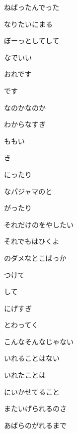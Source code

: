 \documentclass[a4paper,tate,twocolumn,12pt]{ltjtarticle}
\begin{document}
\begin{flushleft}
\begin{minipage}{\linewidth}
ねばったんでった

なりたいにまる

ぼーっとしてして

なでいい
\end{minipage}

\vspace{2em}

\noindent\begin{minipage}{\linewidth}
おれです

です

なのかなのか

わからなすぎ

ももい

き

にったり

なパジャマのと

がったり

それだけのをやしたい

それでもはひくよ
\end{minipage}

\vspace{2em}

\noindent\begin{minipage}{\linewidth}
のダメなとこばっか

つけて

して

にげすぎ

とわってく

こんなそんなじゃない

いれることはない

いれたことは

にいかせてること

またいげられるのさ

あばらのがれるまで
\end{minipage}

\end{flushleft}
\end{document}
